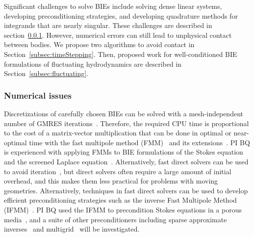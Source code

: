 Significant challenges to solve BIEs include solving dense linear
systems, developing preconditioning strategies, and developing
quadrature methods for integrands that are nearly singular. These
challenges are described in section~\ref{subsec:NumericalIssues}.
However, numerical errors can still lead to unphysical contact between
bodies. We propose two algorithms to avoid contact in
Section~\ref{subsec:timeStepping}. Then, proposed work for
well-conditioned BIE formulations of fluctuating hydrodynamics are
described in Section~\ref{subsec:fluctuating}.


\subsubsection{Numerical issues}
\label{subsec:NumericalIssues}

Discretizations of carefully chosen BIEs can be solved with a
mesh-independent number of GMRES
iterations~\cite{cam-ips-kel-mey-xue1996}. Therefore, the required CPU
time is proportional to the cost of a matrix-vector multiplication that
can be done in optimal or near-optimal time with the fast multipole
method (FMM)~\cite{fmm5} and its extensions~\cite{fmm1, fmm2, fmm3,
fmm4, fmm6, fmm7, fmm8}. PI BQ is experienced with applying FMMs to
BIE formulations of the Stokes equation~\cite{qua-bir2014,
bys-sha-qua2020} and the screened Laplace equation~\cite{kro-qua2011,
qua2011}. Alternatively, fast direct solvers can be used to avoid
iteration~\cite{fds1, fds2, fds3, fds4, fds5, fds6, fds7, fds8,
ho2016cpam2, ho2016cpam1, minden2016, minden2017siammms}, but direct
solvers often require a large amount of initial overhead, and this makes
them less practical for problems with moving geometries. Alternatively,
techniques in fast direct solvers can be used to develop efficient
preconditioning strategies such as the inverse Fast Multipole Method
(IFMM)~\cite{cou-pou-dar2017}. PI BQ used the IFMM to precondition
Stokes equations in a porous media~\cite{qua-cou-dar2018}, and a suite
of other preconditioners including sparse approximate
inverses~\cite{che2000} and multigrid~\cite{hem-sch1981, sch1982} will
be investigated.

